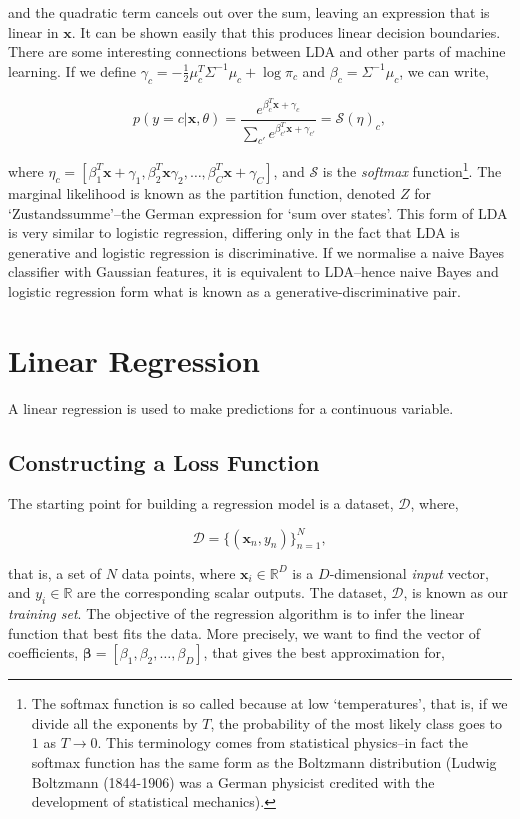 \documentclass[11pt]{amsart}
\begin{document}
and the quadratic term cancels out over the sum, leaving an expression that is linear in $\mathbf{x}$. It can be shown easily that this produces linear decision boundaries. There are some interesting connections between LDA and other parts of machine learning. If we define $\gamma_c = - \frac{1}{2}\mu_c^T\Sigma^{-1}\mu_c + \log\pi_c$ and $\beta_c = \Sigma^{-1}\mu_c$, we can write,

$$p(y = c|\mathbf{x}, \theta) = \frac{e^{\beta_c^T\mathbf{x} + \gamma_c}}{\sum_{c'}e^{\beta_{c'}^T\mathbf{x} + \gamma_{c'}}} = \mathcal{S}({\eta})_c,$$

where $\eta_c = [\beta_1^T\mathbf{x} + \gamma_1, \beta_2^T\mathbf{x} \gamma_2 , \dots, \beta_C^T\mathbf{x} + \gamma_C]$, and $\mathcal{S}$ is the \emph{softmax} function\footnote{The softmax function is so called because at low `temperatures', that is, if we divide all the exponents by $T$, the probability of the most likely class goes to $1$ as $T \to 0$. This terminology comes from statistical physics--in fact the softmax function has the same form as the Boltzmann distribution (Ludwig Boltzmann (1844-1906) was a German physicist credited with the development of statistical mechanics).}. The marginal likelihood is known as the partition function, denoted $Z$ for `Zustandssumme'--the German expression for `sum over states'. This form of LDA is very similar to logistic regression, differing only in the fact that LDA is generative and logistic regression is discriminative. If we normalise a naive Bayes classifier with Gaussian features, it is equivalent to LDA--hence naive Bayes and logistic regression form what is known as a generative-discriminative pair.

\section{Linear Regression}

A linear regression is used to make predictions for a continuous variable.

\subsection{Constructing a Loss Function}
The starting point for building a regression model is a dataset, $\mathcal{D}$, where,

$$\mathcal{D} = \{(\mathbf{x}_n, y_n)\}_{n=1}^{N},$$

that is, a set of $N$ data points, where $\mathbf{x}_i \in \mathbb{R}^D$ is a $D$-dimensional \emph{input} vector, and $y_i \in \mathbb{R}$ are the corresponding scalar outputs. The dataset, $\mathcal{D}$, is known as our \emph{training set}. The objective of the regression algorithm is to infer the linear function that best fits the data. More precisely, we want to find the vector of coefficients, $\boldsymbol\beta = [\beta_1, \beta_2, \dots, \beta_D]$, that gives the best approximation for,
\end{document}
